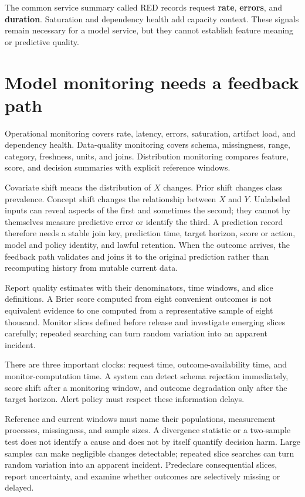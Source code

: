 The common service summary called RED records request \textbf{rate},
\textbf{errors}, and \textbf{duration}. Saturation and dependency health add
capacity context. These signals remain necessary for a model service, but they
cannot establish feature meaning or predictive quality.

\section{Model monitoring needs a feedback path}

Operational monitoring covers rate, latency, errors, saturation, artifact load,
and dependency health. Data-quality monitoring covers schema, missingness,
range, category, freshness, units, and joins. Distribution monitoring compares
feature, score, and decision summaries with explicit reference windows.

Covariate shift means the distribution of $X$ changes. Prior shift changes
class prevalence. Concept shift changes the relationship between $X$ and $Y$.
Unlabeled inputs can reveal aspects of the first and sometimes the second; they
cannot by themselves measure predictive error or identify the third. A
prediction record therefore needs a stable join key, prediction time, target
horizon, score or action, model and policy identity, and lawful retention. When
the outcome arrives, the feedback path validates and joins it to the original
prediction rather than recomputing history from mutable current data.

Report quality estimates with their denominators, time windows, and slice
definitions. A Brier score computed from eight convenient outcomes is not
equivalent evidence to one computed from a representative sample of eight
thousand. Monitor slices defined before release and investigate emerging slices
carefully; repeated searching can turn random variation into an apparent
incident.

There are three important clocks: request time, outcome-availability time, and
monitor-computation time. A system can detect schema rejection immediately,
score shift after a monitoring window, and outcome degradation only after the
target horizon. Alert policy must respect these information delays.

Reference and current windows must name their populations, measurement
processes, missingness, and sample sizes. A divergence statistic or a
two-sample test does not identify a cause and does not by itself quantify
decision harm. Large samples can make negligible changes detectable; repeated
slice searches can turn random variation into an apparent incident. Predeclare
consequential slices, report uncertainty, and examine whether outcomes are
selectively missing or delayed.

